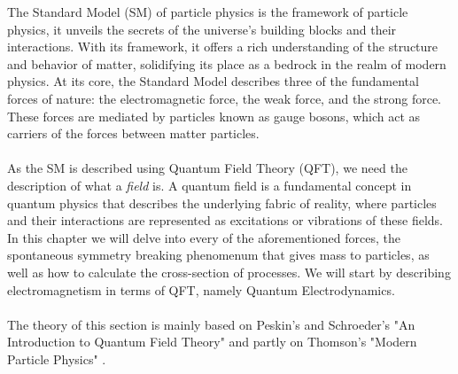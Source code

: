 \documentclass[12pt, a4paper]{book}
\begin{document}
The Standard Model (SM) of particle physics is the framework of particle physics, it unveils the secrets of the universe's building blocks and their interactions. With its framework, it offers a rich understanding 
of the structure and behavior of matter, solidifying its place as a bedrock in the realm of modern physics. At its core, the Standard Model describes three of the fundamental forces of nature: the electromagnetic force, 
the weak force, and the strong force. These forces are mediated by particles known as gauge bosons, which act as carriers of the forces between matter particles.\\
\\As the SM is described using Quantum Field Theory (QFT), we need the description of what a \textit{field} is. A quantum field is a fundamental concept in quantum physics that describes the underlying fabric of reality, 
where particles and their interactions are represented as excitations or vibrations of these fields. In this chapter we will delve into every of the aforementioned forces, the spontaneous symmetry breaking phenomenum that 
gives mass to particles, as well as how to calculate the cross-section of processes. We will start by describing electromagnetism in terms of QFT, namely Quantum Electrodynamics.\\
\\The theory of this section is mainly based on Peskin's and Schroeder's "An Introduction to Quantum Field Theory" \cite{Peskin:1995ev} and partly on Thomson's "Modern Particle Physics" \cite{THOMSON}.

\clearpage
\end{document}
